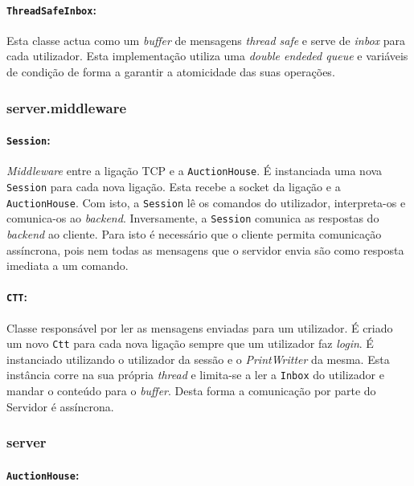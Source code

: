 \documentclass[a4paper]{article}
\begin{document}
\paragraph{\texttt{ThreadSafeInbox}:}

Esta classe actua como um \textit{buffer} de mensagens \textit{thread safe} e serve de \textit{inbox} para cada utilizador. Esta implementação utiliza uma \textit{double endeded queue} e variáveis de condição de forma a garantir a atomicidade das suas operações. 

\subsubsection{server.middleware}
\paragraph{\texttt{Session}:}

\textit{Middleware} entre a ligação TCP e a \texttt{AuctionHouse}. É instanciada uma nova \texttt{Session} para cada nova ligação. Esta recebe a socket da ligação e a \texttt{AuctionHouse}. Com isto, a \texttt{Session} lê os comandos do utilizador, interpreta-os e comunica-os ao \textit{backend}. Inversamente, a \texttt{Session} comunica as respostas do \textit{backend} ao cliente. Para isto é necessário que o cliente permita comunicação assíncrona, pois nem todas as mensagens que o servidor envia são como resposta imediata a um comando.

\paragraph{\texttt{CTT}:}

Classe responsável por ler as mensagens enviadas para um utilizador. É criado um novo \texttt{Ctt} para cada nova ligação sempre que um utilizador faz \textit{login}. É instanciado utilizando o utilizador da sessão e o \textit{PrintWritter} da mesma. Esta instância corre na sua própria \textit{thread} e limita-se a ler a \texttt{Inbox} do utilizador e mandar o conteúdo para o \textit{buffer}. Desta forma a comunicação por parte do Servidor é assíncrona. 

\subsubsection{server}
\paragraph{\texttt{AuctionHouse}:}
\end{document}
